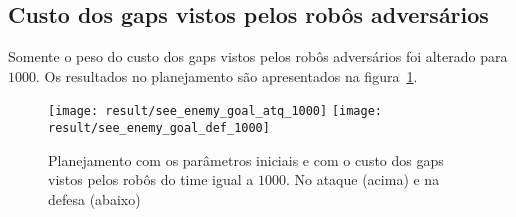 \subsection{Custo dos gaps vistos pelos robôs adversários}
Somente o peso do custo dos gaps vistos pelos robôs adversários foi
alterado para $1000$. Os resultados no planejamento são
apresentados na figura~\ref{fig:see_enemy_goal_1000}.

\begin{figure}[H]
  \centering
  \texttt{[image: result/see\_enemy\_goal\_atq\_1000]}
  \texttt{[image: result/see\_enemy\_goal\_def\_1000]}
  \caption{Planejamento com os parâmetros iniciais e com o custo
           dos gaps vistos pelos robôs do time igual a $1000$.
           No ataque (acima) e na defesa (abaixo)}\label{fig:see_enemy_goal_1000}
\end{figure}

